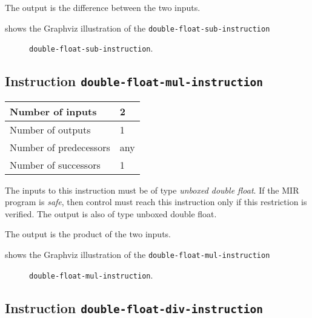 The output is the difference between the two inputs.

 shows the Graphviz illustration of the
\texttt{double-float-sub-instruction}

\begin{figure}
\begin{center}
\end{center}
\caption{\label{fig-double-float-sub-instruction}
\texttt{double-float-sub-instruction}.}
\end{figure}

\subsection{Instruction \texttt{double-float-mul-instruction}}
\label{mir-instruction-double-float-mul}

\begin{tabular}{|l|l|}
\hline
Number of inputs & 2\\
\hline
Number of outputs & 1\\
\hline
Number of predecessors & any\\
\hline
Number of successors & 1\\
\hline
\end{tabular}

The inputs to this instruction must be of type \emph{unboxed double
  float}.  If the MIR program is \emph{safe}, then control must reach
this instruction only if this restriction is verified.  The output is
also of type unboxed double float.

The output is the product of the two inputs.

 shows the Graphviz illustration of the
\texttt{double-float-mul-instruction}

\begin{figure}
\begin{center}
\end{center}
\caption{\label{fig-double-float-mul-instruction}
\texttt{double-float-mul-instruction}.}
\end{figure}

\subsection{Instruction \texttt{double-float-div-instruction}}
\label{mir-instruction-double-float-div}

